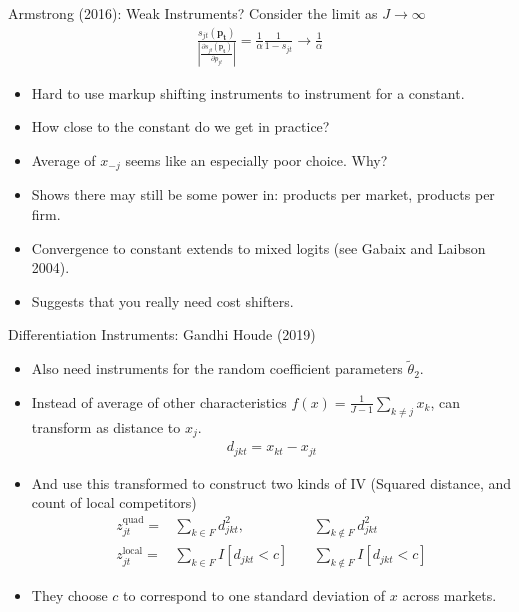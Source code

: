 \documentclass[xcolor=pdftex,dvipsnames,table,mathserif,aspectratio=169]{beamer}
\begin{document}
\begin{frame}{Armstrong (2016): Weak Instruments?}
Consider the limit as $J \rightarrow \infty$
\begin{eqnarray*}
\frac{s_{jt}(\mathbf{p_t})}{\left|\frac{\partial s_{jt}(\mathbf{p_t})}{\partial p_{jt}}\right|} = \frac{1}{\alpha} \frac{1}{1-s_{jt}} \rightarrow \frac{1}{\alpha}
\end{eqnarray*}
\begin{itemize}
\item Hard to use markup shifting instruments to instrument for a constant.
\item How close to the constant do we get in practice?
\item Average of $x_{-j}$ seems like an especially poor choice. Why?
\item Shows there may still be some power in: products per market, products per firm.
\item Convergence to constant extends to mixed logits (see Gabaix and Laibson 2004).
\item Suggests that you really need cost shifters.
\end{itemize}
\end{frame}

\begin{frame}{Differentiation Instruments: Gandhi Houde (2019)}
\small
\begin{itemize}
\item Also need instruments for the random coefficient parameters $\widetilde{\theta}_2$.
\item Instead of average of other characteristics $f(x) = \frac{1}{J-1} \sum_{k \neq j} x_k$, can transform as distance to $x_j$.
\begin{eqnarray*}
d_{jkt} =  x_{kt} - x_{jt}  
\end{eqnarray*}
\item And use this transformed to construct two kinds of IV (Squared distance, and count of local competitors)
\begin{eqnarray*}
z_{jt}^{\text{quad}} =& \sum_{k  \in F}  d_{jkt}^2,  \quad &\sum_{k \notin F}  d_{jkt}^2 \\
z_{jt}^{\text{local}} =& \sum_{k \in F}  I[d_{jkt} < c]   \quad &\sum_{k \notin F}   I[d_{jkt} < c]
\end{eqnarray*}
\item They choose $c$ to correspond to one standard deviation of $x$ across markets.
\end{itemize}
\end{frame}
\end{document}
